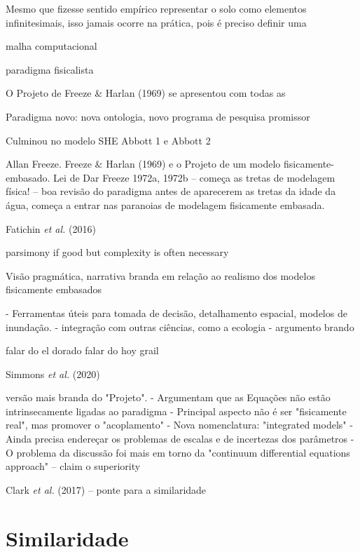 \documentclass[./main.tex]{subfiles}
\begin{document}
Mesmo que fizesse sentido empírico representar o solo como elementos infinitesimais, isso jamais ocorre na prática, pois é preciso definir uma 

malha computacional

paradigma fisicalista

O Projeto de Freeze \& Harlan (1969) se apresentou com todas as

Paradigma novo: nova ontologia, novo programa de pesquisa promissor

Culminou no modelo SHE Abbott 1 e Abbott 2

Allan Freeze. Freeze \& Harlan (1969) e o Projeto de um modelo fisicamente-embasado. Lei de Dar Freeze 1972a, 1972b -- começa as tretas de modelagem física! \cite{Freeze1974} -- boa revisão do \gls{paradigma} antes de aparecerem as tretas da idade da água, começa a entrar nas paranoias de modelagem fisicamente embasada.

Fatichin \textit{et al.} (2016) \cite{Fatichi2016a}

parsimony if good but complexity is often necessary

Visão pragmática, narrativa branda em relação ao realismo dos modelos fisicamente embasados

- Ferramentas úteis para tomada de decisão, detalhamento espacial, modelos de inundação.
- integração com outras ciências, como a ecologia
- argumento brando

falar do el dorado
falar do hoy grail

Simmons \textit{et al.} (2020) \cite{Simmons2020a}

versão mais branda do "Projeto".
- Argumentam que as Equações não estão intrinsecamente ligadas ao paradigma
- Principal aspecto não é ser "fisicamente real", mas promover o "acoplamento"
- Nova nomenclatura: "integrated models"
- Ainda precisa endereçar os problemas de escalas e de incertezas dos parâmetros
- O problema da discussão foi mais em torno da "continuum differential equations approach" -- claim o superiority


Clark \textit{et al.} (2017) \cite{Clark2017a} -- ponte para a similaridade



\section{Similaridade} \label{sec:hydro:sim}
\end{document}

